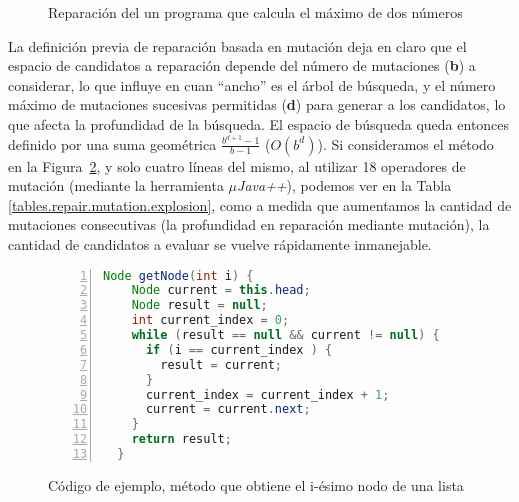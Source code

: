 \begin{figure}
	\caption{Reparaci\'on del un programa que calcula el m\'aximo de dos n\'umeros}
	\label{figures.examples.repairWithMutation}
\end{figure}

La definici\'on previa de reparaci\'on basada en mutaci\'on deja en claro que el espacio de candidatos a reparaci\'on depende del n\'umero de mutaciones (\textbf{b}) a considerar, lo que influye en cuan ``ancho'' es el \'arbol de b\'usqueda, y el n\'umero m\'aximo de mutaciones sucesivas permitidas (\textbf{d}) para generar a los candidatos, lo que afecta la profundidad de la b\'usqueda. El espacio de b\'usqueda queda entonces definido por una suma geom\'etrica $\frac{b^{d+1}-1}{b-1}$ ($O(b^d)$). Si consideramos el m\'etodo en la Figura~\ref{figures.examples.repair.getNode}, y solo cuatro l\'ineas del mismo, al utilizar 18 operadores de mutaci\'on (mediante la herramienta \emph{$\mu$Java++}), podemos ver en la Tabla \ref{tables.repair.mutation.explosion}, como a medida que aumentamos la cantidad de mutaciones consecutivas (la profundidad en reparaci\'on mediante mutaci\'on), la cantidad de candidatos a evaluar se vuelve r\'apidamente inmanejable.

\begin{figure}
	\begin{lstlisting}[mathescape=true,language=Java,numbers=left,xleftmargin=20pt]
  Node getNode(int i) {
    Node current = this.head;
    Node result = null;
    int current_index = 0;
    while (result == null && current != null) {
      if (i == current_index ) {
        result = current;
      }
      current_index = current_index + 1;
      current = current.next;
    }
    return result;
  }
	\end{lstlisting}
	\caption{C\'odigo de ejemplo, m\'etodo que obtiene el i-\'esimo nodo de una lista}
	\label{figures.examples.repair.getNode}
\end{figure}

